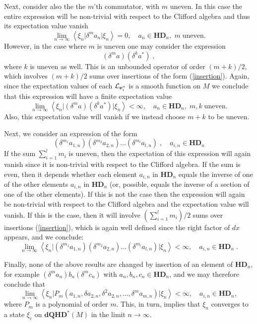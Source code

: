 \documentclass[12pt]{article}
\def\d{\delta}
\def\cl{{\cal L}}
\begin{document}
Next, consider also the the $m$'th commutator, with $m$ uneven. In this case the entire expression will be non-trivial with respect to the Clifford algebra and thus its expectation value vanish
\begin{equation}
\lim_{n\rightarrow\infty}\left\langle \xi_{n} \vert \d^m a_n \vert \xi_{n}\right\rangle =0 ,\quad  a_n\in \mathbf{HD}_n, \; m\; \mbox{uneven}.
\label{ueven}
\end{equation}
However, in the case where $m$ is uneven one may consider the expression 
$$
(\d^m a) (\d^k a^*)\;,
$$
where $k$ is uneven as well. This is an unbounded operator of order $(m+k)/2$, which involves $(m+k)/2$ sums over insertions of the form (\ref{insertion}). Again, since the expectation values of each $\cl_{{\bf e}_i^a}$ is a smooth function on $M$ we conclude that this expression will have a finite expectation value
\begin{equation}
\lim_{n\rightarrow\infty}\left\langle \xi_{n} \vert  (\d^m a) (\d^k a^*)    \vert \xi_{n}\right\rangle< \infty  ,\quad  a_n\in \mathbf{HD}_n, \; m,k\; \mbox{uneven}.
\label{ueven-even}
\end{equation}
Also, this expectation value will vanish if we instead choose $m +k$ to be uneven.


Next, we consider an expression of the form 
$$
(\d^{m_1} a_{1,n})(\d^{m_2} a_{2,n})\ldots (\d^{m_l} a_{l,n})\;, \quad a_{i,n}\in \mathbf{HD}_n
$$ 
If the sum $\sum_{i=1}^l m_i$ is uneven, then the expectation of this expression will again vanish since it is non-trivial with respect to the Clifford algebra. If the sum is even, then it depends whether each element $a_{i,n}$ in $ \mathbf{HD}_n$ equals the inverse of one of the other elements $a_{i,n}$ in $ \mathbf{HD}_n$ (or, possible, equals the inverse of a section of one of the other elements).  If this is not the case then the expression will again be non-trivial with respect to the Clifford algebra and the expectation value will vanish. If this is the case, then it will involve $(\sum_{i=1}^l m_i)/2$ sums over insertions (\ref{insertion}), which is again well defined since the right factor of $dx$ appears, and we conclude:
\begin{equation}
\lim_{n\rightarrow\infty}\left\langle \xi_{n} \vert   (\d^{m_1} a_{1,n})(\d^{m_2} a_{2,n})\ldots (\d^{m_l} a_{l,n})   \vert \xi_{n}\right\rangle< \infty  ,\quad  a_{i,n}\in \mathbf{HD}_n\;.
\label{multi-multi}
\end{equation}

Finally, none of the above results are changed by insertion of an element of $\mathbf{HD}_n$, for example $(\d^m a_n) b_n(\d^m c_n)$ with $ a_n, b_n, c_n \in \mathbf{HD}_n$, and we may therefore conclude that 
\begin{equation}
\lim_{n\rightarrow\infty}\left\langle \xi_{n} \vert  P_m(a_{1,n}, \d a_{2,n}, \d^2 a_{2,n},\ldots,  \d^m a_{m,n} )   \vert \xi_{n}\right\rangle< \infty  ,\quad  a_{i,n}\in \mathbf{HD}_n,
\label{polypop}
\end{equation}
where $P_m$ is a polynomial of order $m$. This, in turn, implies that $\xi_n$ converges to a state $\xi_c$ on $\mathbf{dQHD}^*(M)$ in the limit $n\rightarrow\infty$. 
\end{document}
